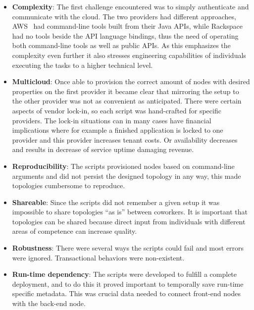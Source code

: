 \begin{itemize}
  \item \textbf{Complexity}: The first challenge encountered was to simply
    authenticate and communicate with the cloud. The two providers 
    had different approaches, AWS~\cite{aws} had command-line tools built from their Java APIs,
    while Rackspace~\cite{rackspace} had no tools beside the API language bindings,
    thus the need of operating both command-line tools as well as public APIs.
    As this emphasizes the complexity even further it also stresses engineering capabilities
    of individuals executing the tasks to a higher technical level.

  \item \textbf{Multicloud}: 
    Once able to provision the correct amount of nodes with desired properties
    on the first provider it became clear that mirroring the setup to the other provider 
    was not as convenient as anticipated.
    There were certain aspects of vendor lock-in, so each script was hand-crafted for specific providers.
    The lock-in situations can in many cases have financial implications where for example
    a finished application is locked to one provider and this provider increases tenant costs.
    Or availability decreases and results in decrease of service uptime damaging revenue.

  \item \textbf{Reproducibility}: The scripts provisioned nodes based on command-line arguments
    and did not persist the designed topology in any way, this made topologies cumbersome to reproduce.

  \item \textbf{Shareable}: Since the scripts did not remember a given setup it was impossible 
    to share topologies ``as is'' between coworkers.
    It is important that topologies can be shared because direct input from individuals
    with different areas of competence can increase quality.

  \item \textbf{Robustness}: There were several ways the scripts could fail and most errors were ignored.
    Transactional behaviors were non-existent.

  \item \textbf{Run-time dependency}: The scripts were developed to fulfill a complete deployment,
    and to do this it proved important to temporally save run-time specific metadata.
    This was crucial data needed to connect front-end nodes with the back-end node.
\end{itemize}


